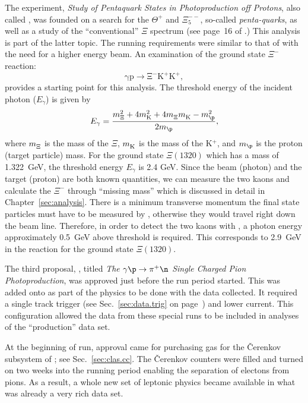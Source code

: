 \label{sec:clas.superg}The  experiment, \emph{Study of Pentaquark States in Photoproduction off Protons}, also called , was founded on a search for the $\Theta^+$ and $\Xi^{--}_{5}$, so-called \emph{penta-quarks}, as well as a study of the ``conventional'' $\Xi$ spectrum (see page~16 of \cite{clas.proposal.superg}.) This analysis is part of the latter topic. The running requirements were similar to that of  with the need for a higher energy beam. An examination of the ground state $\Xi^-$ reaction:
\[
    \mathrm{\gamma p \rightarrow \Xi^- K^+ K^+},
\]
provides a starting point for this analysis. The threshold energy of the incident photon ($E_\gamma$) is given by
\begin{equation}
    E_{\gamma} = \frac{m_{\Xi}^2 + 4 m_{\mathrm{K}}^2 + 4 m_{\rule{0pt}{1.4ex}\Xi} m_{\rule{0pt}{1.4ex}\mathrm{K}} - m_{\p}^2}{2 m_{\p}},
\label{eqn:xi.threshold}
\end{equation}
where $m_{\rule{0px}{1.4ex}\Xi}$ is the mass of the $\Xi$, $m_{\rule{0px}{1.4ex}\mathrm{K}}$ is the mass of the K$^{+}$, and $m_{\p}$ is the proton (target particle) mass. For the ground state $\Xi(1320)$ which has a mass of 1.322~GeV, the threshold energy $E_\gamma$ is 2.4 GeV. Since the beam
(photon) and the target (proton) are both known quantities, we can measure the two kaons and calculate the $\Xi^-$ through ``missing mass'' which is discussed in detail in Chapter~\ref{sec:analysis}. There is a minimum transverse momentum the final state particles must have to be measured by , otherwise they would travel right down the beam line. Therefore, in order to detect the two kaons with , a photon energy approximately 0.5~GeV above threshold is required. This corresponds to 2.9~GeV in the reaction for the ground state $\Xi(1320)$.

The third proposal, , titled \emph{The $\gamma \p \rightarrow \pi^+ \n$ Single Charged Pion Photoproduction}, was approved just before the  run period started. This was added onto  as part of the physics to be done with the data collected. It required a single track trigger (see Sec.~\ref{sec:data.trig} on page~\pageref{sec:data.trig}) and lower current. This configuration allowed the data from these special runs to be included in analyses of the ``production''  data set.

At the beginning of  run, approval came for purchasing gas for the \v{C}erenkov subsystem of ; see Sec.~\ref{sec:clas.cc}. The \v{C}erenkov counters were filled and turned on two weeks into the running period enabling the separation of electons from pions. As a result, a whole new set of leptonic physics became available in what was already a very rich data set.
